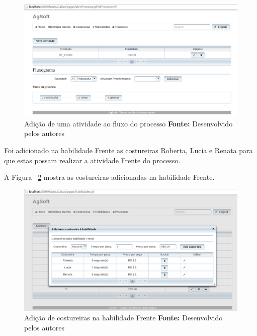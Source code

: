 \newpage

\begin{figure}[h!]
	\centerline{\includegraphics[scale=0.3]{./imagens/adicionar_atividade_frente_teste4.png}}
	\caption[Adição de uma atividade ao fluxo do processo]
	{Adição de uma atividade ao fluxo do processo \textbf{Fonte:} Desenvolvido pelos autores}
	\label{fig:add_frente_teste4}
\end{figure}


\par Foi adicionado na habilidade Frente as costureiras Roberta, Lucia e Renata
para que estas possam realizar a atividade Frente do processo.
\par A Figura ~\ref{fig:add_costureira_frente_teste4} mostra as costureiras
adicionadas na habilidade Frente.

\begin{figure}[h!]
	\centerline{\includegraphics[scale=0.3]{./imagens/costureiras_at_frente_tete5.png}}
	\caption[Adição de costureiras na habilidade Frente]
	{Adição de costureiras na habilidade Frente \textbf{Fonte:} Desenvolvido pelos autores}
	\label{fig:add_costureira_frente_teste4}
\end{figure}

